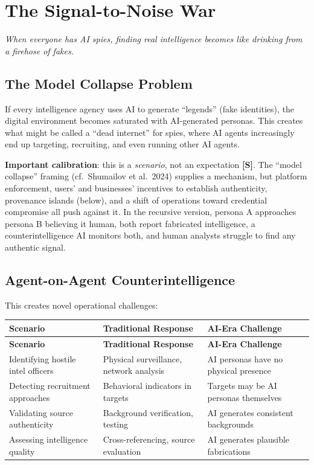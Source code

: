 \documentclass[11pt,letterpaper]{article}
\newcommand{\etraneed}[1]{\par\ifdim\pagegoal<\maxdimen\ifdim\pagetotal<\pagegoal\ifdim\dimexpr\pagegoal-\pagetotal\relax<\dimexpr#1\relax\newpage\fi\fi\fi}
\begin{document}
\section{The Signal-to-Noise War}\label{sec:signalnoise}

\textit{When everyone has AI spies, finding real intelligence becomes like drinking from a firehose of fakes.}

\subsection{The Model Collapse Problem}

If every intelligence agency uses AI to generate ``legends'' (fake identities), the digital environment becomes saturated with AI-generated personas. This creates what might be called a ``dead internet'' for spies, where AI agents increasingly end up targeting, recruiting, and even running other AI agents.

\textbf{Important calibration}: this is a \textit{scenario}, not an expectation \textbf{[S]}. The ``model collapse'' framing (cf.\ Shumailov et al.\ 2024) supplies a mechanism, but platform enforcement, users' and businesses' incentives to establish authenticity, provenance islands (below), and a shift of operations toward credential compromise all push against it. In the recursive version, persona A approaches persona B believing it human, both report fabricated intelligence, a counterintelligence AI monitors both, and human analysts struggle to find any authentic signal.

\subsection{Agent-on-Agent Counterintelligence}

This creates novel operational challenges:

\etraneed{11\baselineskip}
{\small
\begin{longtable}{L{3.5cm}L{4cm}L{4.5cm}}
\toprule
\textbf{Scenario} & \textbf{Traditional Response} & \textbf{AI-Era Challenge} \\
\midrule
\endfirsthead
\toprule
\textbf{Scenario} & \textbf{Traditional Response} & \textbf{AI-Era Challenge} \\
\midrule
\endhead
Identifying hostile intel officers & Physical surveillance, network analysis & AI personas have no physical presence \\*
Detecting recruitment approaches & Behavioral indicators in targets & Targets may be AI personas themselves \\
Validating source authenticity & Background verification, testing & AI generates consistent backgrounds \\*
Assessing intelligence quality & Cross-referencing, source evaluation & AI generates plausible fabrications \\
\bottomrule
\end{longtable}}
\end{document}
